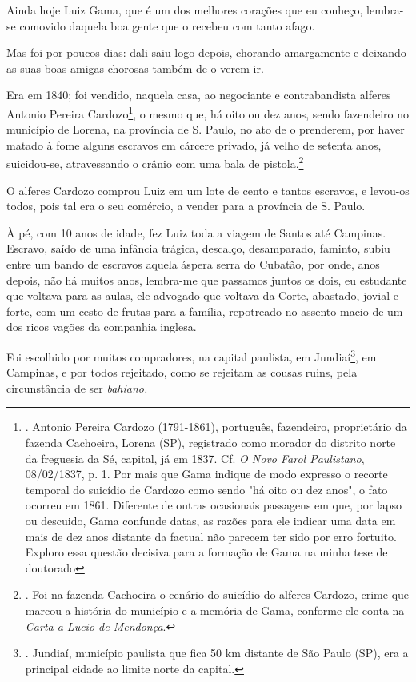 Ainda hoje Luiz Gama, que é um dos melhores corações que eu conheço,
lembra-se comovido daquela boa gente que o recebeu com tanto afago.

Mas foi por poucos dias: dali saiu logo depois, chorando amargamente e
deixando as suas boas amigas chorosas também de o verem ir.

Era em 1840; foi vendido, naquela casa, ao negociante e contrabandista
alferes Antonio Pereira Cardozo\footnote{. Antonio Pereira Cardozo
  (1791-1861), português, fazendeiro, proprietário da fazenda Cachoeira,
  Lorena (SP), registrado como morador do distrito norte da freguesia da
  Sé, capital, já em 1837. Cf. \emph{O Novo Farol Paulistano},
  08/02/1837, p. 1. Por mais que Gama indique de modo expresso o recorte
  temporal do suicídio de Cardozo como sendo "há oito ou dez anos", o
  fato ocorreu em 1861. Diferente de outras ocasionais passagens em que,
  por lapso ou descuido, Gama confunde datas, as razões para ele indicar
  uma data em mais de dez anos distante da factual não parecem ter sido
  por erro fortuito. Exploro essa questão decisiva para a formação de
  Gama na minha tese de doutorado}, o mesmo que, há oito ou dez anos,
sendo fazendeiro no município de Lorena, na província de S. Paulo, no
ato de o prenderem, por haver matado à fome alguns escravos em cárcere
privado, já velho de setenta anos, suicidou-se, atravessando o crânio
com uma bala de pistola.\footnote{. Foi na fazenda Cachoeira o cenário
  do suicídio do alferes Cardozo, crime que marcou a história do
  município e a memória de Gama, conforme ele conta na \emph{Carta a
  Lucio de Mendonça}.}

O alferes Cardozo comprou Luiz em um lote de cento e tantos escravos, e
levou-os todos, pois tal era o seu comércio, a vender para a província
de S. Paulo.

À pé, com 10 anos de idade, fez Luiz toda a viagem de Santos até
Campinas. Escravo, saído de uma infância trágica, descalço, desamparado,
faminto, subiu entre um bando de escravos aquela áspera serra do
Cubatão, por onde, anos depois, não há muitos anos, lembra-me que
passamos juntos os dois, eu estudante que voltava para as aulas, ele
advogado que voltava da Corte, abastado, jovial e forte, com um cesto de
frutas para a família, repotreado no assento macio de um dos ricos
vagões da companhia inglesa.

Foi escolhido por muitos compradores, na capital paulista, em
Jundiaí\footnote{. Jundiaí, município paulista que fica 50 km distante
  de São Paulo (SP), era a principal cidade ao limite norte da capital.},
em Campinas, e por todos rejeitado, como se rejeitam as cousas ruins,
pela circunstância de ser \emph{bahiano.}

